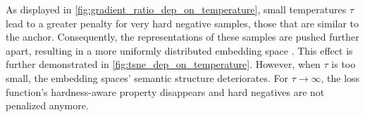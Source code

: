 As displayed in \autoref{fig:gradient_ratio_dep_on_temperature}, 
small temperatures $\tau$ lead to a greater penalty for very hard negative samples, those that are similar to the anchor.
Consequently, the representations of these samples are pushed further apart, 
resulting in a more uniformly distributed embedding space \citet{CL_temp_2021,grape_2024}. 
This effect is further demonstrated in \autoref{fig:tsne_dep_on_temperature}.
However, when $\tau$ is too small, the embedding spaces' semantic structure deteriorates.
For $\tau \rightarrow \infty$, the loss function's hardness-aware property disappears and hard negatives are not penalized anymore.